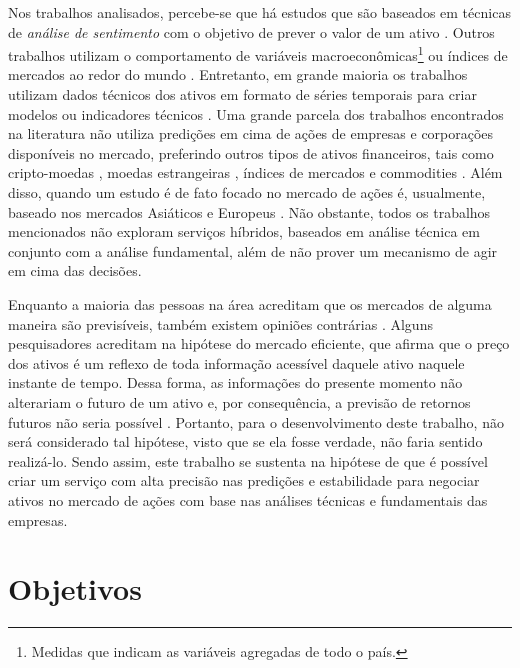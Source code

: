 Nos trabalhos analisados, percebe-se que há estudos que são baseados em técnicas de \textit{análise de sentimento} com o objetivo de prever o valor de um ativo \cite{google_trends, review}. Outros trabalhos utilizam o comportamento de variáveis macroeconômicas\footnote{Medidas que indicam as variáveis agregadas de todo o país.} ou índices de mercados ao redor do mundo \cite{random_forest_macroeconomic, forecasting_bayesian, review}. Entretanto, em grande maioria os trabalhos utilizam dados técnicos dos ativos em formato de séries temporais para criar modelos ou indicadores técnicos \cite{fusionportifolio, cesarone2011portfolio, airms, ga_optimized_lstm}. Uma grande parcela dos trabalhos encontrados na literatura não utiliza predições em cima de ações de empresas e corporações disponíveis no mercado, preferindo outros tipos de ativos financeiros, tais como cripto-moedas \cite{cryptocurrency}, moedas estrangeiras \cite{classification_dnn, airms}, índices de mercados \cite{forecasting_bayesian, increase_decrease, ga_optimized_lstm} e commodities \cite{classification_dnn}. Além disso, quando um estudo é de fato focado no mercado de ações é, usualmente, baseado nos mercados Asiáticos e Europeus \cite{review}. Não obstante, todos os trabalhos mencionados não exploram serviços híbridos, baseados em análise técnica em conjunto com a análise fundamental, além de não prover um mecanismo de agir em cima das decisões.

Enquanto a maioria das pessoas na área acreditam que os mercados de alguma maneira são previsíveis, também existem opiniões contrárias \cite{review}. Alguns pesquisadores acreditam na hipótese do mercado eficiente, que afirma que o preço dos ativos é um reflexo de toda informação acessível daquele ativo naquele instante de tempo. Dessa forma, as informações do presente momento não alterariam o futuro de um ativo e, por consequência, a previsão de retornos futuros não seria possível \cite{fama}. Portanto, para o desenvolvimento deste trabalho, não será considerado tal hipótese, visto que se ela fosse verdade, não faria sentido realizá-lo. Sendo assim, este trabalho se sustenta na hipótese de que é possível criar um serviço com alta precisão nas predições e estabilidade para negociar ativos no mercado de ações com base nas análises técnicas e fundamentais das empresas.

\section{Objetivos}

